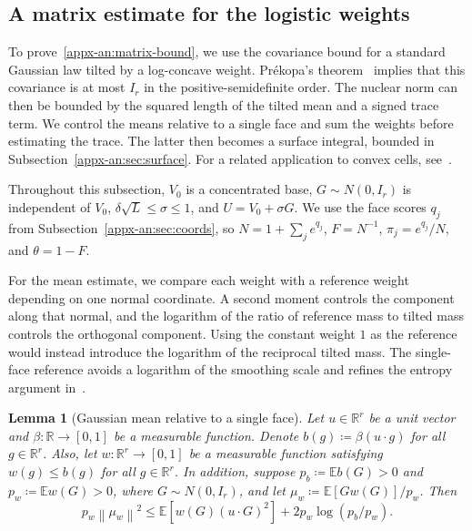 \documentclass[11pt,letterpaper]{article}
\newtheorem{lemma}{Lemma}
\theoremstyle{remark}
\newcommand{\E}{\mathbb E}
\newcommand{\R}{\mathbb R}
\newcommand{\norm}[1]{\left\lVert#1\right\rVert}
\begin{document}
\subsection{A matrix estimate for the logistic weights}
\label{appx-an:sec:matrix}

To prove~\eqref{appx-an:matrix-bound}, we use the covariance bound for
a standard Gaussian law tilted by a log-concave weight. Pr\'ekopa's
theorem~\cite[Theorem~6]{Prekopa1973} implies that this covariance is
at most \(I_r\) in the positive-semidefinite order. The nuclear norm
can then be bounded by the squared length of the tilted mean and a
signed trace term. We control the means relative to a single face and sum the
weights before estimating the trace. The latter then becomes a
surface integral, bounded in Subsection~\ref{appx-an:sec:surface}.
For a related application to convex cells,
see~\cite[Lemma~12]{GaoZhang}.

Throughout this subsection, \(V_0\) is a concentrated base,
\(G\sim N(0,I_r)\) is independent of \(V_0\),
\(\delta\sqrt L\le\sigma\le1\), and \(U=V_0+\sigma G\).
We use the face scores \(q_j\) from
Subsection~\ref{appx-an:sec:coords}, so
\(N=1+\sum_j e^{q_j}\), \(F=N^{-1}\),
\(\pi_j=e^{q_j}/N\), and \(\theta=1-F\).

For the mean estimate, we compare each weight with a reference weight
depending on one normal coordinate. A second moment controls the
component along that normal, and the logarithm of the ratio of
reference mass to tilted mass controls the orthogonal component.
Using the constant weight \(1\) as the reference would instead introduce
the logarithm of the reciprocal tilted mass. The single-face reference
avoids a logarithm of the smoothing scale and refines the entropy argument
in~\cite[Lemma~12]{GaoZhang}.

\begin{lemma}[Gaussian mean relative to a single face]
\label{appx-an:lem:mean}
Let \(u\in\R^r\) be a unit vector and
\(\beta:\R\to[0,1]\) be a measurable function. Denote
\(b(g)\coloneqq\beta(u\cdot g)\) for all \(g\in\R^r\).
Also, let \(w:\R^r\to[0,1]\) be a measurable function
satisfying \(w(g)\le b(g)\) for all $g\in\R^r$.
In addition, suppose \(p_b\coloneqq\E b(G)>0\) and
\(p_w\coloneqq\E w(G)>0\), where \(G\sim N(0,I_r)\),
and let \(\mu_w\coloneqq\E[Gw(G)]/p_w\). Then
\begin{equation}
 p_w\norm{\mu_w}^2
 \le \E[w(G)(u\cdot G)^2]
        +2p_w\log(p_b/p_w).
 \label{appx-an:mean-entropy}
\end{equation}
\end{lemma}
\end{document}
